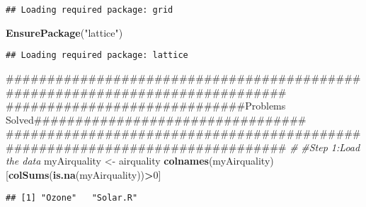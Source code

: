 \documentclass[]{article}
\newenvironment{Shaded}{\begin{snugshade}}{\end{snugshade}}
\newcommand{\KeywordTok}[1]{\textcolor[rgb]{0.13,0.29,0.53}{\textbf{#1}}}
\newcommand{\DecValTok}[1]{\textcolor[rgb]{0.00,0.00,0.81}{#1}}
\newcommand{\StringTok}[1]{\textcolor[rgb]{0.31,0.60,0.02}{#1}}
\newcommand{\CommentTok}[1]{\textcolor[rgb]{0.56,0.35,0.01}{\textit{#1}}}
\newcommand{\OperatorTok}[1]{\textcolor[rgb]{0.81,0.36,0.00}{\textbf{#1}}}
\newcommand{\NormalTok}[1]{#1}
\begin{document}
\begin{verbatim}
## Loading required package: grid
\end{verbatim}

\begin{Shaded}
\begin{Highlighting}[]
\KeywordTok{EnsurePackage}\NormalTok{(}\StringTok{"lattice"}\NormalTok{)}
\end{Highlighting}
\end{Shaded}

\begin{verbatim}
## Loading required package: lattice
\end{verbatim}

\begin{Shaded}
\begin{Highlighting}[]
\NormalTok{#############################################################################}
\NormalTok{#############################Problems Solved#################################}
\NormalTok{#############################################################################}
\CommentTok{#}
\CommentTok{#Step 1:Load the data}
\NormalTok{myAirquality <-}\StringTok{ }\NormalTok{airquality}
\KeywordTok{colnames}\NormalTok{(myAirquality)[}\KeywordTok{colSums}\NormalTok{(}\KeywordTok{is.na}\NormalTok{(myAirquality))}\OperatorTok{>}\DecValTok{0}\NormalTok{]}
\end{Highlighting}
\end{Shaded}

\begin{verbatim}
## [1] "Ozone"   "Solar.R"
\end{verbatim}
\end{document}
